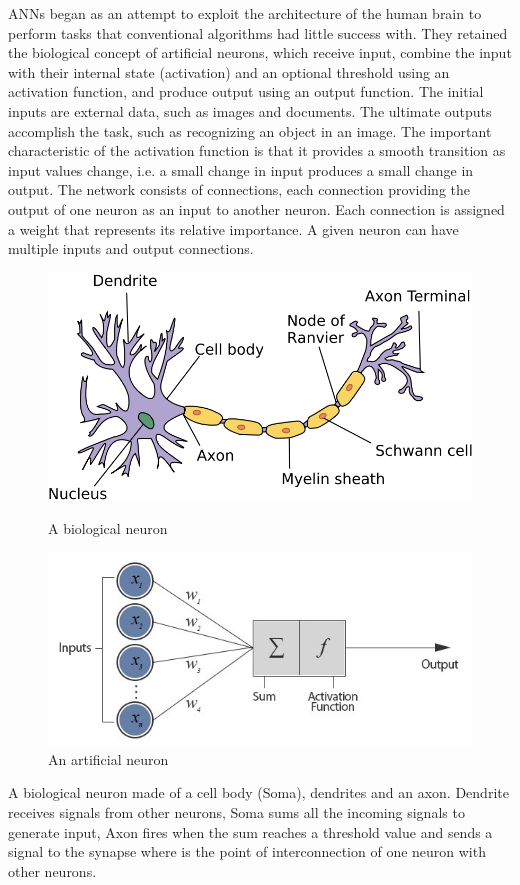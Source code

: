 \documentclass[10pt]{SelfArx} %
\begin{document}
	ANNs began as an attempt to exploit the architecture of the human brain to perform tasks that conventional algorithms had little success with. They retained the biological concept of artificial neurons, which receive input, combine the input with their internal state (activation) and an optional threshold using an activation function, and produce output using an output function. The initial inputs are external data, such as images and documents. The ultimate outputs accomplish the task, such as recognizing an object in an image. The important characteristic of the activation function is that it provides a smooth transition as input values change, i.e. a small change in input produces a small change in output. The network consists of connections, each connection providing the output of one neuron as an input to another neuron. Each connection is assigned a weight that represents its relative importance. A given neuron can have multiple inputs and output connections.
	\begin{figure}\centering
		\includegraphics[width=\linewidth]{img/neuron}
		\caption{A biological neuron}
		\includegraphics[width=\linewidth]{img/aneuron}
		\caption{An artificial neuron}	
	\end{figure}
	A biological neuron made of a cell body (Soma), dendrites and an axon. Dendrite receives signals from other neurons, Soma sums all the incoming signals to generate input, Axon fires when the sum reaches a threshold value and sends a signal to the synapse where is the point of interconnection of one neuron with other neurons.
	
\end{document}
